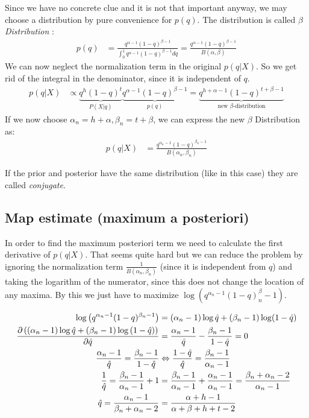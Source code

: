 \documentclass[../main/Notes.tex]{subfiles}
\begin{document}
Since we have no concrete clue and it is not that important anyway, we may choose a distribution by pure convenience for $p(q)$. The distribution is called \textit{$\beta$ Distribution} :
\begin{align*}
p(q) &= \frac{q^{\alpha-1}(1-q)^{\beta-1}}{\int_0^1 q^{\alpha-1}(1-q)^{\beta-1}dq} = \frac{q^{\alpha-1}(1-q)^{\beta-1}}{B(\alpha,\beta)}
\end{align*}
We can now neglect the normalization term in the original $p(q|X)$. So we get rid of the integral in the denominator, since it is independent of $q$.
\begin{align*}
p(q|X) &\propto \underbrace{q^h(1-q)^t}_{P(X|q)} \underbrace{q^{\alpha-1}(1-q)^{\beta-1}}_{p(q)} = \underbrace{q^{h+\alpha-1}(1-q)^{t+\beta-1}}_\text{new $\beta$-distribution}
\end{align*}
If we now choose $\alpha_n = h+\alpha, \beta_n = t+\beta$, we can express the new $\beta$ Distribution as:
\begin{align*}
p(q|X) &= \frac{q^{\alpha_n-1}(1-q)^{\beta_n-1}}{B(\alpha_n, \beta_n)} 
\end{align*}

If the prior and posterior have the same distribution (like in this case) they are called \textit{conjugate}.

\subsection{Map estimate (maximum a posteriori)}
In order to find the maximum posteriori term we need to calculate the first derivative of $p(q|X)$. That seems quite hard but we can reduce the problem by ignoring the normalization term $\frac{1}{B(\alpha_n, \beta_n)}$ (since it is independent from $q$) and taking the logarithm of the numerator, since this does not change the location of any maxima. By this we just have to maximize $\log(q^{\alpha_n-1}(1-q)^\beta_n-1)$.

\begin{align*}
\log{\left(q^{\alpha_n-1}(1-q)^{\beta_n-1}\right)} &= (\alpha_n-1)\log \est{q} + (\beta_n-1)\log (1-\est{q}) \\
\frac{\partial \left(\left(\alpha_n-1\right)\log \est{q} + \left(\beta_n-1\right)\log \left(1-\est{q}\right)\right)}{\partial \est{q}} &= \frac{\alpha_n-1}{\est{q}} - \frac{\beta_n-1}{1-\est{q}} = 0 \\
\frac{\alpha_n-1}{\est{q}} = \frac{\beta_n-1}{1-\est{q}} &\Leftrightarrow \frac{1-\est{q}}{\est{q}} = \frac{\beta_n-1}{\alpha_n-1} \\
\frac{1}{\est{q}} = \frac{\beta_n-1}{\alpha_n-1}+1 &= \frac{\beta_n-1}{\alpha_n-1} + \frac{\alpha_n-1}{\alpha_n-1} = \frac{\beta_n+\alpha_n-2}{\alpha_n-1} \\
\est{q} = \frac{\alpha_n-1}{\beta_n+\alpha_n-2} &= \frac{\alpha+h-1}{\alpha+\beta+h+t-2}
\end{align*}
\end{document}
